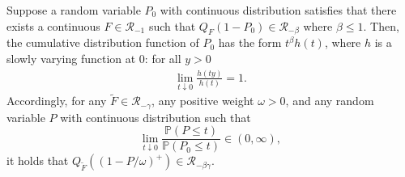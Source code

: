 \documentclass[10pt,a4paper]{amsart}
\renewcommand{\Pr}{\mathbb{P}}
\begin{document}
\begin{lem}
\label{lemma:assmp-1-iii-ensure-rv}
Suppose a random variable $P_0$ with continuous distribution satisfies that there exists a continuous $F\in\mathscr{R}_{-1}$ such that $Q_F(1-P_0)\in\mathscr{R}_{-\beta}$ where $\beta\le1$. Then, the cumulative distribution function of $P_0$ has the form $t^\beta h(t)$, where $h$ is a slowly varying function at $0$: for all $y>0$
\begin{align} \label{eq:slowvary}
  \lim_{t\downarrow0}\frac{h(ty)}{h(t)}=1.  
\end{align}
Accordingly, for any $\tilde{F}\in\mathscr{R}_{-\gamma}$, any positive weight $\omega>0$, and any random variable $P$ with continuous distribution such that
\[
\lim_{t\downarrow0}\frac{\Pr(P\le t)}{\Pr(P_0\le t)}\in(0,\infty),
\]
it holds that $Q_{\tilde{F}}((1-P/\omega)^+)\in\mathscr{R}_{-\beta\gamma}$.
\end{lem}
\end{document}

